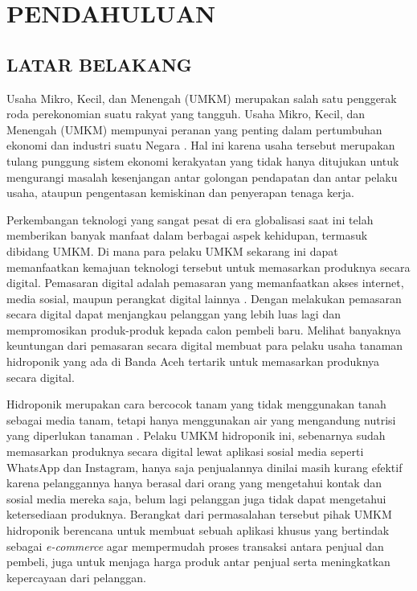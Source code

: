 \fancyhf{} 
\fancyfoot[C]{\thepage}

\chapter{PENDAHULUAN}

\section{\uppercase{LATAR BELAKANG}}
Usaha Mikro, Kecil, dan Menengah (UMKM) merupakan salah satu penggerak roda perekonomian suatu rakyat yang tangguh. Usaha Mikro, Kecil, dan Menengah (UMKM) mempunyai peranan yang penting dalam pertumbuhan ekonomi dan industri suatu Negara \citep{prastika2014pengaruh}. Hal ini karena usaha tersebut merupakan tulang punggung sistem ekonomi kerakyatan yang tidak hanya ditujukan untuk mengurangi masalah kesenjangan antar golongan pendapatan dan antar pelaku usaha, ataupun pengentasan kemiskinan dan penyerapan tenaga kerja.

\par Perkembangan teknologi yang sangat pesat di era globalisasi saat ini telah memberikan banyak manfaat dalam berbagai aspek kehidupan, termasuk dibidang UMKM. Di mana para pelaku UMKM sekarang ini dapat memanfaatkan kemajuan teknologi tersebut untuk memasarkan produknya secara digital. Pemasaran digital adalah pemasaran yang memanfaatkan akses internet, media sosial, maupun perangkat digital lainnya \citep{hardilawati2020strategi}. Dengan melakukan pemasaran secara digital dapat menjangkau pelanggan yang lebih luas lagi dan mempromosikan produk-produk kepada calon pembeli baru. Melihat banyaknya keuntungan dari pemasaran secara digital membuat para pelaku usaha tanaman hidroponik yang ada di Banda Aceh tertarik untuk memasarkan produknya secara digital.

\par Hidroponik merupakan cara bercocok tanam yang tidak menggunakan tanah sebagai media tanam, tetapi hanya menggunakan air yang mengandung nutrisi yang diperlukan tanaman \citep{prayitno2017sistem}. Pelaku UMKM hidroponik ini, sebenarnya sudah memasarkan produknya secara digital lewat aplikasi sosial media seperti WhatsApp dan Instagram, hanya saja penjualannya dinilai masih kurang efektif karena pelanggannya hanya berasal dari orang yang mengetahui kontak dan sosial media mereka saja, belum lagi pelanggan juga tidak dapat mengetahui ketersediaan produknya. Berangkat dari permasalahan tersebut pihak UMKM hidroponik berencana untuk membuat sebuah aplikasi khusus yang bertindak sebagai \textit{e-commerce} agar mempermudah proses transaksi antara penjual dan pembeli, juga untuk menjaga harga produk antar penjual serta meningkatkan kepercayaan dari pelanggan.

